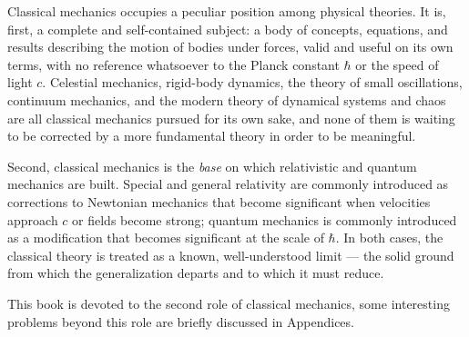Classical mechanics occupies a peculiar position among physical theories. It is,
first, a complete and self-contained subject: a body of concepts, equations, and
results describing the motion of bodies under forces, valid and useful on its own
terms, with no reference whatsoever to the Planck constant $\hbar$ or the speed of
light $c$. Celestial mechanics, rigid-body dynamics, the theory of small
oscillations, continuum mechanics, and the modern theory of dynamical systems and
chaos are all classical mechanics pursued for its own sake, and none of them is
waiting to be corrected by a more fundamental theory in order to be meaningful.

Second,  classical mechanics is
the \emph{base} on which relativistic and quantum mechanics are built. Special and
general relativity are commonly introduced as corrections to Newtonian mechanics
that become significant when velocities approach $c$ or fields become strong;
quantum mechanics is commonly introduced as a modification that becomes significant
at the scale of $\hbar$. In both cases, the classical theory is treated as a known,
well-understood limit --- the solid ground from which the generalization departs
and to which it must reduce.

This book is devoted to the second role of classical mechanics, some
interesting problems beyond this role are briefly discussed in Appendices.

